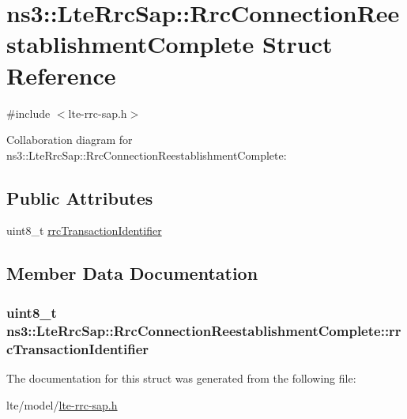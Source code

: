 \hypertarget{structns3_1_1LteRrcSap_1_1RrcConnectionReestablishmentComplete}{}\section{ns3\+:\+:Lte\+Rrc\+Sap\+:\+:Rrc\+Connection\+Reestablishment\+Complete Struct Reference}
\label{structns3_1_1LteRrcSap_1_1RrcConnectionReestablishmentComplete}


{\ttfamily \#include $<$lte-\/rrc-\/sap.\+h$>$}



Collaboration diagram for ns3\+:\+:Lte\+Rrc\+Sap\+:\+:Rrc\+Connection\+Reestablishment\+Complete\+:
\subsection*{Public Attributes}
\begin{DoxyCompactItemize}
\item 
uint8\+\_\+t \hyperlink{structns3_1_1LteRrcSap_1_1RrcConnectionReestablishmentComplete_a3193b6871e5898d5c12d3d35bfbf48ad}{rrc\+Transaction\+Identifier}
\end{DoxyCompactItemize}


\subsection{Member Data Documentation}
\subsubsection[{\texorpdfstring{rrc\+Transaction\+Identifier}{rrcTransactionIdentifier}}]{\setlength{\rightskip}{0pt plus 5cm}uint8\+\_\+t ns3\+::\+Lte\+Rrc\+Sap\+::\+Rrc\+Connection\+Reestablishment\+Complete\+::rrc\+Transaction\+Identifier}\hypertarget{structns3_1_1LteRrcSap_1_1RrcConnectionReestablishmentComplete_a3193b6871e5898d5c12d3d35bfbf48ad}{}\label{structns3_1_1LteRrcSap_1_1RrcConnectionReestablishmentComplete_a3193b6871e5898d5c12d3d35bfbf48ad}


The documentation for this struct was generated from the following file\+:\begin{DoxyCompactItemize}
\item 
lte/model/\hyperlink{lte-rrc-sap_8h}{lte-\/rrc-\/sap.\+h}\end{DoxyCompactItemize}
